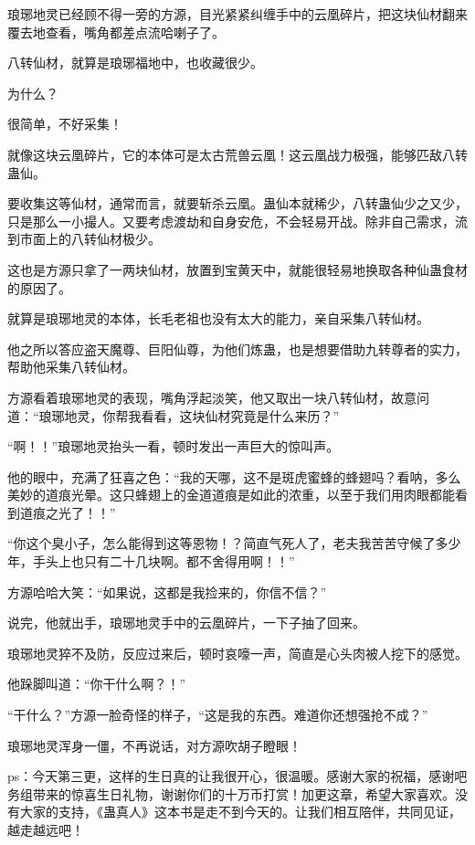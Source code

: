 \begin{this_body}
琅琊地灵已经顾不得一旁的方源，目光紧紧纠缠手中的云凰碎片，把这块仙材翻来覆去地查看，嘴角都差点流哈喇子了。

八转仙材，就算是琅琊福地中，也收藏很少。

为什么？

很简单，不好采集！

就像这块云凰碎片，它的本体可是太古荒兽云凰！这云凰战力极强，能够匹敌八转蛊仙。

要收集这等仙材，通常而言，就要斩杀云凰。蛊仙本就稀少，八转蛊仙少之又少，只是那么一小撮人。又要考虑渡劫和自身安危，不会轻易开战。除非自己需求，流到市面上的八转仙材极少。

这也是方源只拿了一两块仙材，放置到宝黄天中，就能很轻易地换取各种仙蛊食材的原因了。

就算是琅琊地灵的本体，长毛老祖也没有太大的能力，亲自采集八转仙材。

他之所以答应盗天魔尊、巨阳仙尊，为他们炼蛊，也是想要借助九转尊者的实力，帮助他采集八转仙材。

方源看着琅琊地灵的表现，嘴角浮起淡笑，他又取出一块八转仙材，故意问道：“琅琊地灵，你帮我看看，这块仙材究竟是什么来历？”

“啊！！”琅琊地灵抬头一看，顿时发出一声巨大的惊叫声。

他的眼中，充满了狂喜之色：“我的天哪，这不是斑虎蜜蜂的蜂翅吗？看呐，多么美妙的道痕光晕。这只蜂翅上的金道道痕是如此的浓重，以至于我们用肉眼都能看到道痕之光了！！”

“你这个臭小子，怎么能得到这等恩物！？简直气死人了，老夫我苦苦守候了多少年，手头上也只有二十几块啊。都不舍得用啊！！”

方源哈哈大笑：“如果说，这都是我捡来的，你信不信？”

说完，他就出手，琅琊地灵手中的云凰碎片，一下子抽了回来。

琅琊地灵猝不及防，反应过来后，顿时哀嚎一声，简直是心头肉被人挖下的感觉。

他跺脚叫道：“你干什么啊？！”

“干什么？”方源一脸奇怪的样子，“这是我的东西。难道你还想强抢不成？”

琅琊地灵浑身一僵，不再说话，对方源吹胡子瞪眼！

ps：今天第三更，这样的生日真的让我很开心，很温暖。感谢大家的祝福，感谢吧务组带来的惊喜生日礼物，谢谢你们的十万币打赏！加更这章，希望大家喜欢。没有大家的支持，《蛊真人》这本书是走不到今天的。让我们相互陪伴，共同见证，越走越远吧！

\end{this_body}

